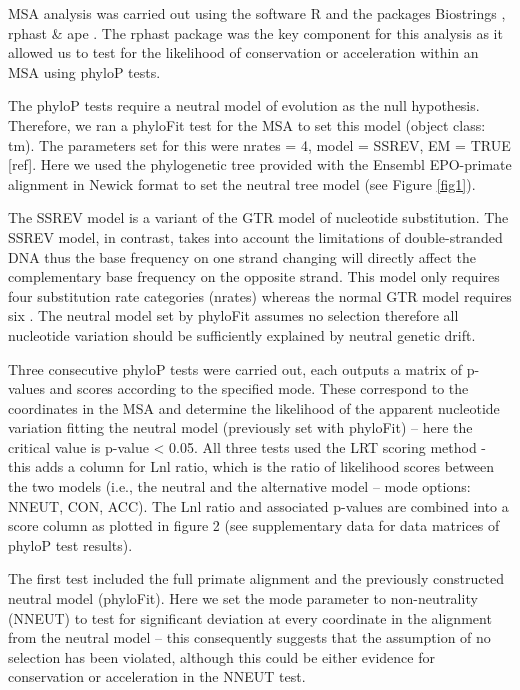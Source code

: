 \documentclass{article}[12pt]
\begin{document}
MSA analysis was carried out using the software R \parencite{R} and the packages Biostrings \parencite{Biostrings}, rphast \parencite{Rphast} \& ape \parencite{Ape}. The rphast package was the key component for this analysis as it allowed us to test for the likelihood of conservation or acceleration within an MSA using phyloP tests.

The phyloP tests require a neutral model of evolution as the null hypothesis. Therefore, we ran a phyloFit test for the MSA to set this model (object class: tm). The parameters set for this were nrates = 4, model = SSREV, EM = TRUE [ref]. Here we used the phylogenetic tree provided with the Ensembl EPO-primate alignment in Newick format to set the neutral tree model (see Figure \ref{fig1}).

The \Gls{SSREV} model is a variant of the \Gls{GTR} model of nucleotide substitution. The SSREV model, in contrast, takes into account the limitations of double-stranded DNA thus the base frequency on one strand changing will directly affect the complementary base frequency on the opposite strand. This model only requires four substitution rate categories (nrates) whereas the normal GTR model requires six \parencite{PhyloP, Gittelman2015}. The neutral model set by phyloFit assumes no selection therefore all nucleotide variation should be sufficiently explained by neutral genetic drift.

Three consecutive phyloP tests were carried out, each outputs a matrix of p-values and scores according to the specified mode. These correspond to the coordinates in the MSA and determine the likelihood of the apparent nucleotide variation fitting the neutral model (previously set with phyloFit) – here the critical value is p-value < 0.05. All three tests used the \Gls{LRT} scoring method - this adds a column for Lnl ratio, which is the ratio of likelihood scores between the two models (i.e., the neutral and the alternative model – mode options: NNEUT, CON, ACC). The Lnl ratio and associated p-values are combined into a score column as plotted in figure 2 (see supplementary data for data matrices of phyloP test results).

The first test included the full primate alignment and the previously constructed neutral model (phyloFit). Here we set the mode parameter to non-neutrality (NNEUT) to test for significant deviation at every coordinate in the alignment from the neutral model – this consequently suggests that the assumption of no selection has been violated, although this could be either evidence for conservation or acceleration in the NNEUT test.
\end{document}
